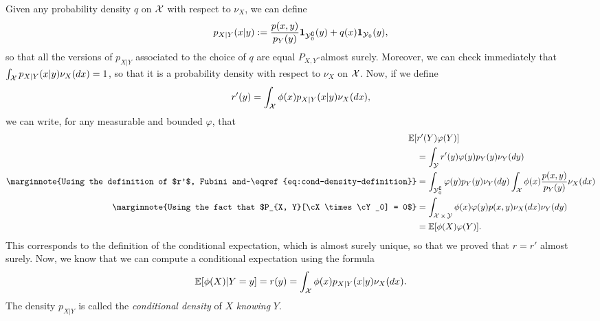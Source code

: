 Given any probability density $q$ on $\operatorname{{\mathcal X}}$ with respect to $\nu_X$, we can define
\begin{equation}
	\label{eq:cond-density-definition}
	p_{X | Y}(x | y) := \frac{p(x, y)}{p_Y(y)} \mathbf 1_{\operatorname{{\mathcal Y}}_0^\complement}(y) + q(x) \mathbf 1_{\operatorname{{\mathcal Y}}_0}(y),
\end{equation}
so that all the versions of $p_{X | Y}$ associated to the choice of $q$ are equal $P_{X, Y}$-almost surely.
Moreover, we can check immediately that $\int_{\operatorname{{\mathcal X}}} p_{X | Y}(x | y) \nu_X(dx) = 1$, so that it is a probability density with respect to $\nu_X$ on $\operatorname{{\mathcal X}}$.
Now, if we define
\begin{equation*}
	r'(y) = \int_{\operatorname{{\mathcal X}}} \phi(x) p_{X | Y}(x | y) \nu_X(dx),
\end{equation*}
we can write, for any measurable and bounded $\varphi$, that
\begin{align*}
	\E[ &r'(Y) \varphi(Y)] \\
	&= \int_{\cY} r'(y) \varphi(y) p_Y(y) \nu_Y(dy) \\
	\marginnote{Using the definition of $r'$, Fubini and~\eqref{eq:cond-density-definition}}
	&= \int_{\cY_0^\complement} \varphi(y) p_Y(y) \nu_Y(dy) 
	\int_{\cX} \phi(x) \frac{p(x, y)}{p_Y(y)} \nu_X(dx) \\
	\marginnote{Using the fact that $P_{X, Y}[\cX \times \cY_0] = 0$}
	&= \int_{\cX \times \cY} \phi(x) \varphi(y) p(x, y) \nu_X(dx) \nu_Y(dy) \\
	&= \E[ \phi(X) \varphi(Y)].
\end{align*}
This corresponds to the definition of the conditional expectation, which is almost surely unique, so that we proved that $r = r'$ almost surely.
Now, we know that we can compute a conditional expectation using the formula
\begin{equation*}
	\mathbb E[\phi(X) | Y = y] = r(y) = \int_{\operatorname{{\mathcal X}}} \phi(x) p_{X | Y}(x | y) \nu_X(dx).
\end{equation*}
The density $p_{X | Y}$ is called the \emph{conditional density} of $X$ \emph{knowing} $Y$.


